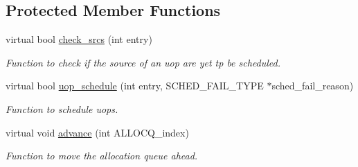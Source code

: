 \subsection*{Protected Member Functions}
\begin{DoxyCompactItemize}
\item 
virtual bool \hyperlink{classschedule__c_a011e59bfd10373a4aaefec4c12a533de}{check\_\-srcs} (int entry)
\begin{DoxyCompactList}\small\item\em Function to check if the source of an uop are yet tp be scheduled. \item\end{DoxyCompactList}\item 
virtual bool \hyperlink{classschedule__c_a62bd97881f5ec86cee27a80b25b87ba9}{uop\_\-schedule} (int entry, SCHED\_\-FAIL\_\-TYPE $\ast$sched\_\-fail\_\-reason)
\begin{DoxyCompactList}\small\item\em Function to schedule uops. \item\end{DoxyCompactList}\item 
virtual void \hyperlink{classschedule__c_a35f2f1ea49453967c863c5de1acae87e}{advance} (int ALLOCQ\_\-index)
\begin{DoxyCompactList}\small\item\em Function to move the allocation queue ahead. \item\end{DoxyCompactList}\end{DoxyCompactItemize}
